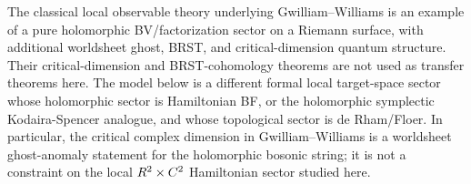 \documentclass[11pt]{memoir}
\begin{document}
\begin{rmk}
  The classical local observable theory underlying Gwilliam--Williams is an
  example of a pure holomorphic BV/factorization sector on a Riemann
  surface, with additional worldsheet ghost, BRST, and critical-dimension
  quantum structure. Their critical-dimension and BRST-cohomology theorems
  are not used as transfer theorems here. The model below is a different formal local
  target-space sector whose holomorphic sector is Hamiltonian BF, or the
  holomorphic symplectic Kodaira-Spencer analogue, and whose topological
  sector is de Rham/Floer. In particular, the critical complex dimension in
  Gwilliam--Williams is a worldsheet ghost-anomaly statement for the
  holomorphic bosonic string; it is not a constraint on the local
  $R^2\times C^2$ Hamiltonian sector studied here.
\end{rmk}
\end{document}
